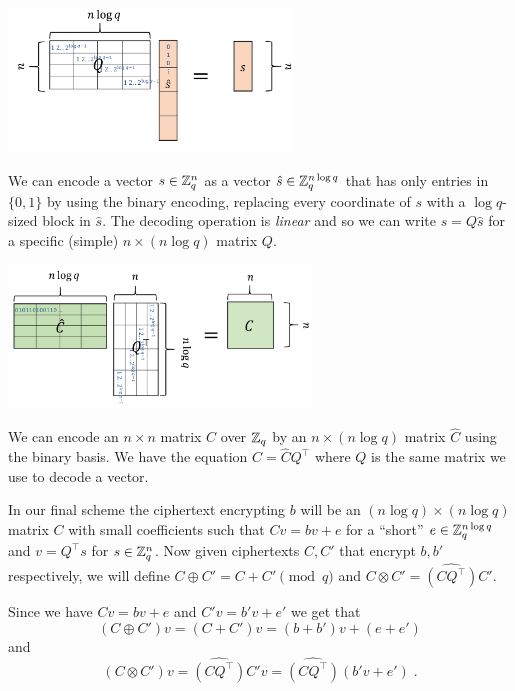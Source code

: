 \begin{marginfigure}
\centering
\includegraphics[width=\linewidth, height=1.5in, keepaspectratio]{../figure/encodevec.png}
\caption{We can encode a vector \(s\in {\mathbb{Z}}_q^n\) as a vector
\(\hat{s} \in {\mathbb{Z}}_q^{n\log q}\) that has only entries in \(\{0,1\}\) by
using the binary encoding, replacing every coordinate of \(s\) with a
\(\log q\)-sized block in \(\hat{s}\). The decoding operation is
\emph{linear} and so we can write \(s=Q\hat{s}\) for a specific (simple)
\(n \times (n\log q)\) matrix \(Q\).}
\label{encodevecfig}
\end{marginfigure}

\begin{marginfigure}
\centering
\includegraphics[width=\linewidth, height=1.5in, keepaspectratio]{../figure/encodematrix.png}
\caption{We can encode an \(n\times n\) matrix \(C\) over \({\mathbb{Z}}_q\) by an
\(n\times (n \log q)\) matrix \(\hat{C}\) using the binary basis. We
have the equation \(C=\hat{C}Q^\top\) where \(Q\) is the same matrix we
use to decode a vector.}
\label{encodematrixfig}
\end{marginfigure}

In our final scheme the ciphertext encrypting \(b\) will be an
\((n\log q)\times (n\log q)\) matrix \(C\) with small coefficients such
that \(Cv =bv + e\) for a ``short'' \(e \in {\mathbb{Z}}_q^{n\log q}\) and
\(v=Q^\top s\) for \(s\in{\mathbb{Z}}_q^n\). Now given ciphertexts \(C,C'\) that
encrypt \(b,b'\) respectively, we will define
\(C \oplus C' = C + C' \pmod{q}\) and
\(C \otimes C' = \widehat{(\ensuremath{\mathit{CQ}}^\top)}C'\).

Since we have \(Cv = bv + e\) and \(C'v = b'v + e'\) we get that
\[(C\oplus C')v = (C+C')v = (b+b')v + (e+e') \label{eqfheaddfinal}\] and
\[(C\otimes C')v = \widehat{(\ensuremath{\mathit{CQ}}^\top)}C'v = \widehat{(\ensuremath{\mathit{CQ}}^\top)}(b'v+e') \;. \label{fhemultfinaleqfirst}\]

